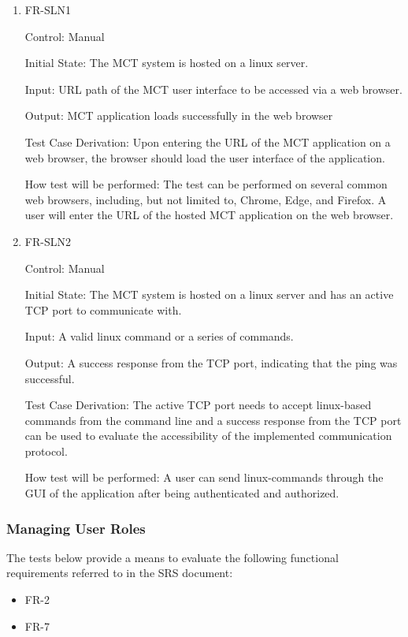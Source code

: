 \documentclass[12pt, titlepage]{article}
\begin{document}
\begin{enumerate}

\item{FR-SLN1\\}

Control: Manual
					
Initial State: The MCT system is hosted on a linux server.
					
Input: URL path of the MCT user interface to be accessed via a web browser.
					
Output: MCT application loads successfully in the web browser

Test Case Derivation: Upon entering the URL of the MCT application on a web browser, the browser should load the user interface of the application.
					
How test will be performed: 
The test can be performed on several common web browsers, including, but not limited to, Chrome, Edge, and Firefox. A user will enter the URL of the hosted MCT application on the web browser.

					
\item{FR-SLN2\\}

Control: Manual
					
Initial State: The MCT system is hosted on a linux server and has an active TCP port to communicate with.
					
Input: A valid linux command or a series of commands.
					
Output: A success response from the TCP port, indicating that the ping was successful.

Test Case Derivation: The active TCP port needs to accept linux-based commands from the command line and a success response from the TCP port can be used to evaluate the accessibility of the implemented communication protocol.

How test will be performed: A user can send linux-commands through the GUI of the application after being authenticated and authorized.


\end{enumerate}

\subsubsection{Managing User Roles}

The tests below provide a means to evaluate the following functional requirements referred to in the SRS document:
\begin{itemize}
    \item FR-2
    \item FR-7
\end{itemize}
\end{document}
